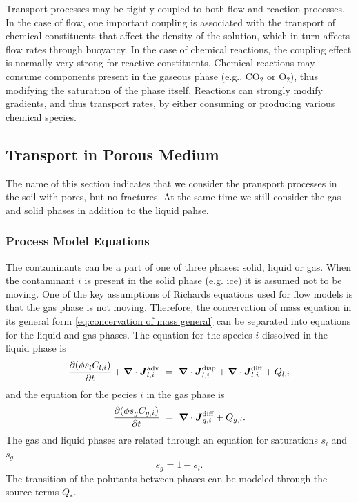 Transport processes may be tightly coupled to both flow and reaction processes.  
In the case of flow, one important coupling is associated with the transport of chemical 
constituents that affect the density of the solution, which in turn affects flow rates through buoyancy.
In the case of chemical reactions, the coupling effect is normally very strong for reactive constituents.  
Chemical reactions may consume components present in the gaseous phase (e.g., CO$_2$ or O$_2$), thus 
modifying the saturation of the phase itself.  
Reactions can strongly modify gradients, and thus transport rates, by either consuming 
or producing various chemical species.



\subsection{Transport in Porous Medium} 
\label{sec:transport-single-phase}

The name of this section indicates that we consider the pransport processes in the soil with 
pores, but no fractures.
At the same time we still consider the gas and solid phases in addition to the liquid pahse.

\subsubsection{Process Model Equations} 

The contaminants can be a part of one of three phases:
solid, liquid or gas.
When the contaminant $i$ is present in the solid phase (e.g. ice)
it is assumed not to be moving.
One of the key assumptions of Richards equations used for flow models 
is that the gas phase is not moving.  
Therefore, the concervation of mass equation in its general form 
\eqref{eq:concervation of mass general}
can be separated into equations
for the liquid and gas phases.
The equation for the species $i$ dissolved in the liquid phase is
\begin{equation}  \label{eq:MassConservation}
  \frac{\partial ( \phi s_l C_{l,i} )}{\partial t } + {\boldsymbol{\nabla}} \cdot {\boldsymbol{J}}_{l,i}^\text{adv} 
  \ =\  
  {\boldsymbol{\nabla}} \cdot {\boldsymbol{J}}_{l,i}^\text{disp} + {\boldsymbol{\nabla}} \cdot {\boldsymbol{J}}_{l,i}^\text{diff} + Q_{l,i}
\end{equation}
and the equation for the pecies $i$ in the gas phase is
\begin{equation}  \label{eq:MassConservation gas}
  \frac{\partial ( \phi s_g C_{g,i} )}{\partial t } 
  \ =\  
  {\boldsymbol{\nabla}} \cdot {\boldsymbol{J}}_{g,i}^\text{diff} + Q_{g,i}.
\end{equation}
The gas and liquid phases are related through an equation for saturations $s_l$ and $s_g$
$$
  s_g = 1-s_l.
$$
The transition of the polutants between phases can be modeled through the source terms $Q_*$. 



